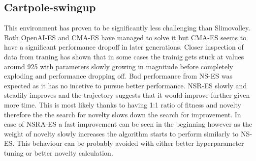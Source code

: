 \subsection{Cartpole-swingup}

This environment has proven to be significantly less challenging than Slimovolley. Both OpenAI-ES and CMA-ES have managed to solve it but CMA-ES seems to have a significant performance dropoff in later generations. Closer inspection of data from traning has shown that in some cases the trainig gets stuck at values around 925 with parameters slowly growing in magnitude before completely exploding and performance dropping off. Bad performance from NS-ES was expected as it has no incetive to pursue better performance. NSR-ES slowly and steadily improves and the trajectory suggests that it would improve further given more time. This is most likely thanks to having 1:1 ratio of fitness and novelty therefore the the search for novelty slows down the search for improvement. In case of NSRA-ES a fast improvement can be seen in the beginning however as the weight of novelty slowly increases the algorithm starts to perform similarly to NS-ES. This behaviour can be probably avoided with either better hyperparameter tuning or better novelty calculation.



